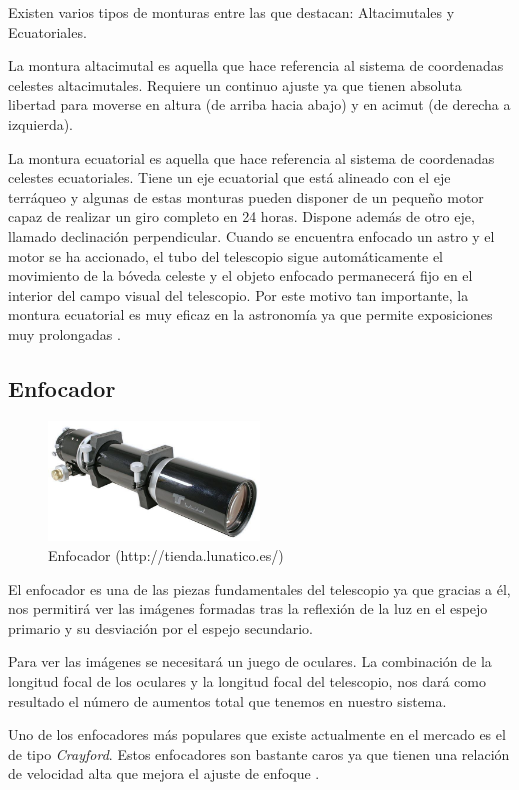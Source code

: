 Existen varios tipos de monturas entre las que destacan: Altacimutales y Ecuatoriales.

La montura altacimutal es aquella que hace referencia al sistema de coordenadas celestes altacimutales. Requiere un continuo ajuste ya que tienen absoluta libertad para moverse en altura (de arriba hacia abajo) y en acimut (de derecha a izquierda).

La montura ecuatorial es aquella que hace referencia al sistema de coordenadas celestes ecuatoriales. Tiene un eje ecuatorial que está alineado con el eje terráqueo y algunas de estas monturas pueden disponer de un pequeño motor capaz de realizar un giro completo en 24 horas. Dispone además de otro eje, llamado declinación perpendicular.
Cuando se encuentra enfocado un astro y el motor se ha accionado, el tubo del telescopio sigue automáticamente el movimiento de la bóveda celeste y el objeto enfocado permanecerá fijo en el interior del campo visual del telescopio. Por este motivo tan importante, la montura ecuatorial es muy eficaz en la astronomía ya que permite exposiciones muy prolongadas \cite{MonturaTelescopio}.


\subsection{Enfocador}
\begin{figure}[htb]
\centering
\includegraphics[width=0.5\textwidth]{./imagenes/enfocador}
\caption{Enfocador (http://tienda.lunatico.es/)} \label{fig:enfocador}
\end{figure}
El enfocador es una de las piezas fundamentales del telescopio ya que gracias a él, nos permitirá ver las imágenes formadas tras la reflexión de la luz en el espejo primario y su desviación por el espejo secundario.

Para ver las imágenes se necesitará un juego de oculares. La combinación de la longitud focal de los oculares y la longitud focal del telescopio, nos dará como resultado el número de aumentos total que tenemos en nuestro sistema.

Uno de los enfocadores más populares que existe actualmente en el mercado es el de tipo \textit{Crayford}. Estos enfocadores son bastante caros ya que tienen una relación de velocidad alta que mejora el ajuste de enfoque \cite{Enfocador}.


